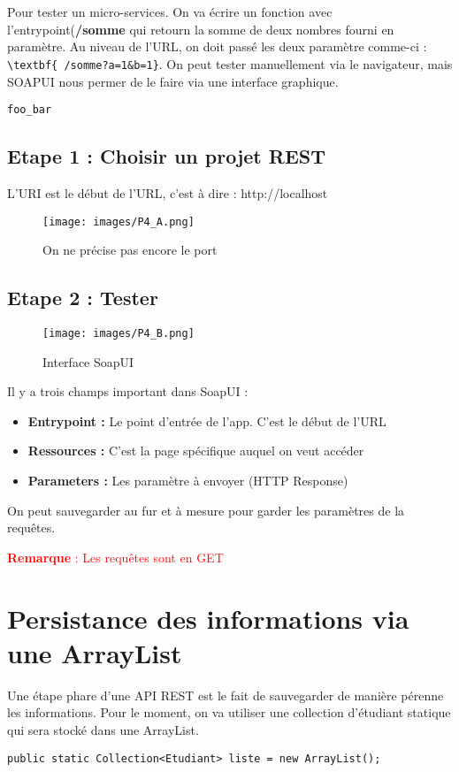 \documentclass{rapport}
\begin{document}
Pour tester un micro-services. On va écrire un fonction avec l'entrypoint(\textbf{/somme} qui retourn la somme de deux nombres fourni en paramètre. Au niveau de l'URL, on doit passé les deux paramètre comme-ci : \verb| \textbf{ /somme?a=1&b=1}|. On peut tester manuellement via le navigateur, mais SOAPUI nous permer de le faire via une interface graphique.

\verb|foo_bar|

\subsection{Etape 1 : Choisir un projet REST}

L'URI est le début de l'URL, c'est à dire : http://localhost

\begin{figure}[H]
	\centering
    \texttt{[image: images/P4\_A.png]}
    \caption{On ne précise pas encore le port}
\end{figure}

\subsection{Etape 2 : Tester}

\begin{figure}[H]
	\centering
    \texttt{[image: images/P4\_B.png]}
    \caption{Interface SoapUI}
\end{figure}

Il y a trois champs important dans SoapUI :
\begin{itemize}
	\item \textbf{Entrypoint :} Le point d'entrée de l'app. C'est le début de l'URL
	\item \textbf{Ressources : } C'est la page spécifique auquel on veut accéder
	\item \textbf{Parameters : } Les paramètre à envoyer (HTTP Response)
\end{itemize}
On peut sauvegarder au fur et à mesure pour garder les paramètres de la requêtes.

\textcolor{red}{\textbf{Remarque} : Les requêtes sont en GET}

\section{Persistance des informations via une ArrayList}

Une étape phare d'une API REST est le fait de sauvegarder de manière pérenne les informations. Pour le moment, on va utiliser une collection d'étudiant statique qui sera stocké dans une ArrayList.\newline
\begin{lstlisting}
public static Collection<Etudiant> liste = new ArrayList();
\end{lstlisting}
\end{document}
